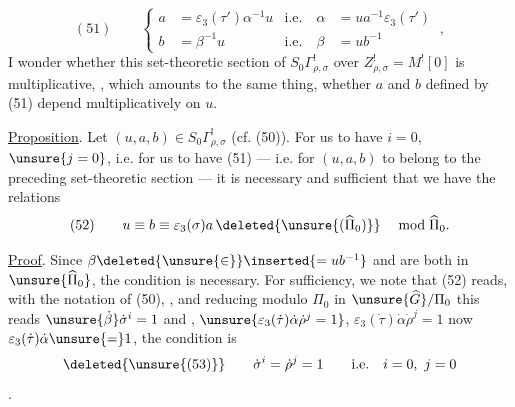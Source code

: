 \[
(51)\qquad
\left\{\begin{aligned}
a&=\varepsilon_3(\tau')\alpha^{-1}u
&\text{i.e.}\quad \alpha&=ua^{-1}\varepsilon_3(\tau')\\
b&=\beta^{-1}u
&\text{i.e.}\quad \beta&=ub^{-1}
\end{aligned}\right.\ ,
\]
I wonder whether this set-theoretic section of
$S_0\Gamma_{\rho,\sigma}^{!}$ over
$Z_{\rho,\sigma}^{!}=M^{!}[0]$ is multiplicative,
, which amounts to the same thing,
whether $a$ and $b$ defined by (51) depend multiplicatively on
 $u$.

\uline{Proposition}. Let $(u,a,b)\in S_0\Gamma_{\rho,\sigma}^{!}$
(cf. (50)). For us to have $i=0$, $\unsure{j=0}$, i.e. for us to
have (51) --- i.e. for $(u,a,b)$ 
to belong to the preceding set-theoretic section --- it is necessary and sufficient
that we have the relations
\[
(52)\qquad u\equiv b\equiv\varepsilon_3(\sigma)a\,
\deleted{\unsure{(\widehat\Pi_0)}}\quad\bmod\widehat\Pi_0.
\]


\uline{Proof}. Since
$\beta\deleted{\unsure{\in}}\inserted{=ub^{-1}}$ and
are both in $\unsure{\widehat\Pi_0}$, the condition is
necessary. For sufficiency, we note that (52) reads, with the
notation of (50),
,
and reducing modulo $\Pi_0$ in $\unsure{\widehat G}/\Pi_0$
this reads $\unsure{\dot\beta}\dot\sigma^{i}=1$ and
,
$\unsure{\varepsilon_3(\dot\tau)\dot\alpha\dot\rho^{j}=1}$,
$\varepsilon_3(\dot\tau)\dot\alpha\dot\rho^{j}=1$
now $\varepsilon_3(\dot\tau)\dot\alpha\unsure{=}1$,
the condition is
\[
\deleted{\unsure{(53)}}\qquad
\dot\sigma^{i}=\dot\rho^{j}=1\qquad\text{i.e.}\quad i=0,\ j=0
\]
.


